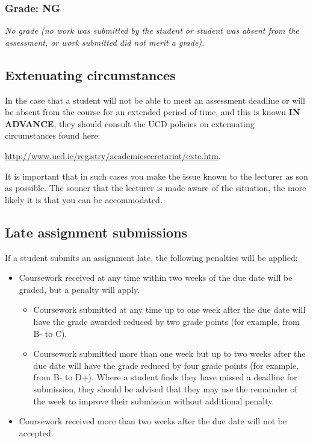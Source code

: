 \subsubsection*{Grade: NG}

\textit{No grade (no work was submitted by the student or student was absent from the assessment, or work submitted did not merit a grade).}

\subsection*{Extenuating circumstances}

	In the case that a student will not be able to meet an assessment deadline or will be absent from the course for an extended period of time, and this is known \textbf{IN ADVANCE}, they should consult the UCD policies on extenuating circumstances found here:

\vspace{5mm}

\url{http://www.ucd.ie/registry/academicsecretariat/extc.htm}. 

\vspace{5mm}

	It is important that in such cases you make the issue known to the lecturer as son as possible. The sooner that the lecturer is made aware of the situation, the more likely it is that you can be accommodated.

\subsection*{Late assignment submissions}

	If a student submits an assignment late, the following penalties will be applied:

\begin{itemize}
	\item Coursework received at any time within two weeks of the due date will be graded, but a penalty will apply.
	\begin{itemize}
		\item Coursework submitted at any time up to one week after the due date will have the grade awarded reduced by two grade points (for example, from B- to C).
		\item Coursework submitted more than one week but up to two weeks after the due date will have the grade reduced by four grade points (for example, from B- to D+).
Where a student finds they have missed a deadline for submission, they should be advised that they may use the remainder of the week to improve their submission without additional penalty.
	\end{itemize}
	\item Coursework received more than two weeks after the due date will not be accepted.
\end{itemize}

